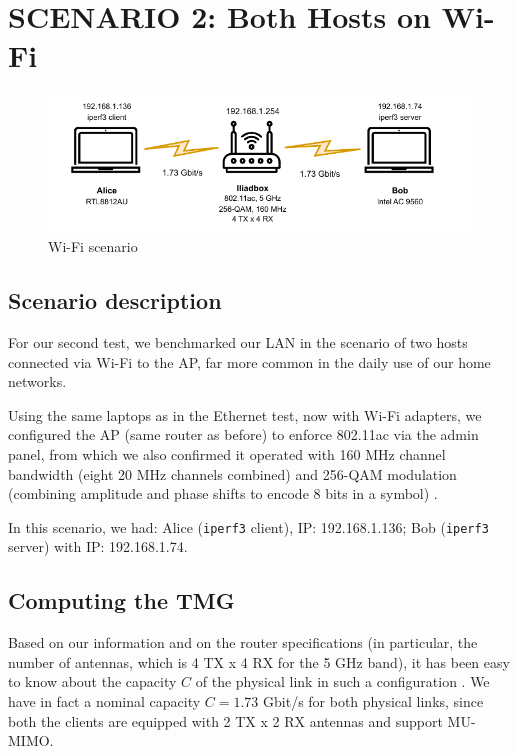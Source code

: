\section{SCENARIO 2: Both Hosts on Wi-Fi}
\label{sec:wifi}
\begin{figure}[h]
    \centering
    \includegraphics[width=0.95\linewidth]{images/wifi.drawio-3.pdf}
    \caption{Wi-Fi scenario}
    \label{fig:enter-label}
\end{figure}
\subsection{Scenario description}
For our second test, we benchmarked our LAN in the scenario of two hosts connected via Wi-Fi to the AP, far more common in the daily use of our home networks.

Using the same laptops as in the Ethernet test, now with Wi-Fi adapters, we configured the AP (same router as before) to enforce 802.11ac via the admin panel, from which we also confirmed it operated with 160 MHz channel bandwidth (eight 20 MHz channels combined) \cite{wikipedia_channelbonding} and 256-QAM modulation (combining amplitude and phase shifts to encode 8 bits in a symbol) \cite{wikipedia_qam}.

In this scenario, we had: Alice (\texttt{iperf3} client), IP: 192.168.1.136; Bob (\texttt{iperf3} server) with IP: 192.168.1.74.

\subsection{Computing the TMG}
Based on our information and on the router specifications (in particular, the number of antennas, which is 4 TX x 4 RX for the 5 GHz band), it has been easy to know about the capacity $C$ of the physical link in such a configuration \cite{wikipedia_80211ac}.
We have in fact a nominal capacity $C=1.73$ Gbit/s for both physical links, since both the clients are equipped with 2 TX x 2 RX antennas and support MU-MIMO. 

